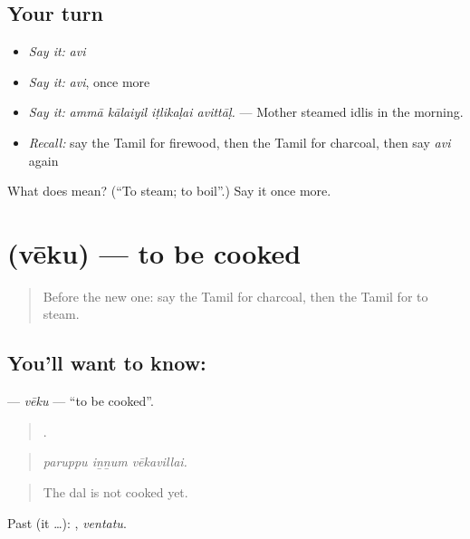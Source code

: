 \subsection*{Your turn}
\begin{itemize}
\raggedright
  \item \emph{Say it:} \emph{avi}
  \item \emph{Say it:} \emph{avi}, once more
  \item \emph{Say it:} \emph{ammā kālaiyil iṭlikaḷai avittāḷ.} — Mother steamed idlis in the morning.
  \item \emph{Recall:} say the Tamil for firewood, then the Tamil for charcoal, then say \emph{avi} again
\end{itemize}

\begin{tcolorbox}[breakable,colback=teal!4,colframe=teal!35!black,title={Before you move on}]
What does  mean? (\textquotedblleft{}To steam; to boil\textquotedblright{}.) Say it once more.
\end{tcolorbox}
\section[\texorpdfstring{\ta{வேகு} (vēku)}{வேகு (vēku)}]{ (vēku) — to be cooked}

\label{lesson:TA-C525-veku}



\begin{quote}
Before the new one: say the Tamil for charcoal, then the Tamil for to steam.
\end{quote}

\subsection*{You'll want to know: }
\textbf{} — \emph{vēku} — \textquotedblleft{}to be cooked\textquotedblright{}.

\begin{quote}
  .
\end{quote}

\begin{quote}
\emph{paruppu iṉṉum vēkavillai.}
\end{quote}

\begin{quote}
The dal is not cooked yet.
\end{quote}

Past (it …): , \emph{ventatu}.

